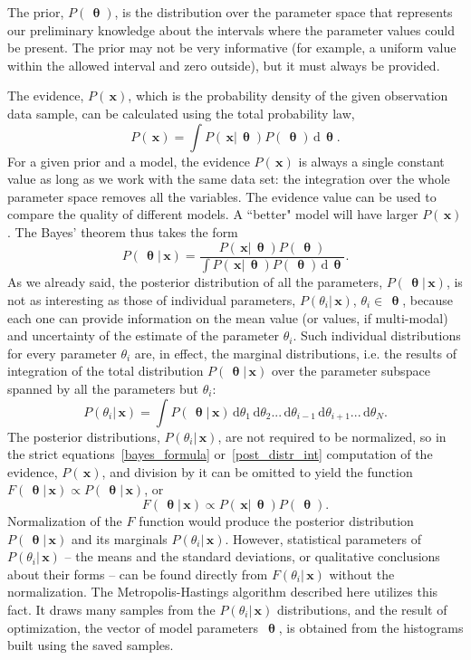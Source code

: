 \documentclass[preprint2]{aastex}
\newcommand{\bfx}{\,\mathbf{x}}
\newcommand{\bfth}{\,\bm{\uptheta}}
\newcommand{\ud}{\,\mathrm{d}}
\begin{document}
The prior, $P(\bfth)$, is the distribution over the parameter space that represents our preliminary knowledge about the intervals where the parameter values could be present.
The prior may not be very informative (for example, a uniform value within the allowed interval and zero outside), but it must always be provided.  

The evidence, $P(\bfx)$, which is the probability density of the given observation data sample, can be calculated using the total probability law,
\begin{equation}
  P(\bfx) = \int P(\bfx|\bfth)P(\bfth) \ud \bfth.
\end{equation}
For a given prior and a model, the evidence $P(\bfx)$ is always a single constant value as long as we work with the same data set: the integration over the whole parameter space removes all the variables. The evidence value can be used to compare the quality of different models. A ``better" model will have larger $P(\bfx)$. The Bayes' theorem thus takes the form
\begin{equation}
  \label{post_distr_int}
  P(\bfth|\bfx) =  \frac{P(\bfx|\bfth)P(\bfth)}{\int P(\bfx|\bfth)P(\bfth) \ud \bfth}.
\end{equation}
As we already said, the posterior distribution of all the parameters, $P(\bfth|\bfx)$, is not as interesting as those of individual parameters, $P(\theta_i|\bfx)$, $\theta_i \in \bfth$, because each one can provide information on the mean value (or values, if multi-modal) and uncertainty of the estimate of the parameter $\theta_i$. Such individual distributions for every parameter $\theta_i$ are, in effect, the marginal distributions, i.e. the results of integration of the total distribution $P(\bfth|\bfx)$ over the parameter subspace spanned by all the parameters but $\theta_i$:
\begin{equation}
  \label{param_post_distr}
  P(\theta_i|\bfx) =  \int P(\bfth|\bfx)\ud \theta_1 \ud \theta_2 ... \ud \theta_{i-1} \ud \theta_{i+1} ... \ud \theta_N.
\end{equation}
The posterior distributions, $P(\theta_i|\bfx)$, are not required to be normalized, so in the strict equations~\eqref{bayes_formula} or~\eqref{post_distr_int} computation of the evidence, $P(\bfx)$, and division by it can be omitted to yield the function $F(\bfth|\bfx) \propto P(\bfth|\bfx)$, or 
\begin{equation}
  \label{bayes_propor}
  F(\bfth|\bfx) \propto P(\bfx|\bfth)P(\bfth).
\end{equation}
Normalization of the $F$ function would produce the posterior distribution $P(\bfth|\bfx)$ and its marginals $P(\theta_i|\bfx)$. However, statistical parameters of $P(\theta_i|\bfx)$ -- the means and the standard deviations, or qualitative conclusions about their forms -- can be found directly from $F(\theta_i|\bfx)$ without the normalization. The Metropolis-Hastings algorithm described here utilizes this fact. It draws many samples from the $P(\theta_i|\bfx)$ distributions, and the result of optimization, the vector of model parameters $\bfth$, is obtained from the histograms built using the saved samples. 
\end{document}
